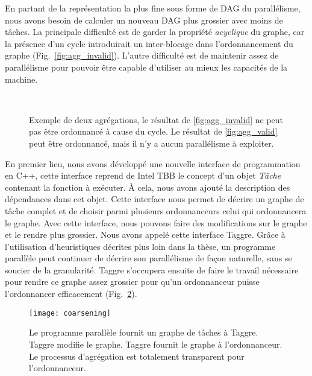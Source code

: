 En partant de la représentation la plus fine sous forme de DAG du parallélisme, nous avons besoin de calculer un nouveau DAG plus grossier avec moins de tâches.
%
La principale difficulté est de garder la propriété {\em acyclique} du graphe, car la présence d'un cycle introduirait un inter-blocage dans l'ordonnancement du graphe (Fig.~\ref{fig:agg_invalid}).
%
L'autre difficulté est de maintenir assez de parallélisme pour pouvoir être capable d'utiliser au mieux les capacités de la machine.
\begin{figure}[!h]
     \begin{center}
        ~
    \end{center}
    \caption{Exemple de deux agrégations, le résultat de \ref{fig:agg_invalid} ne peut pas être ordonnancé à cause du cycle. Le résultat de \ref{fig:agg_valid} peut être ordonnancé, mais il n'y a aucun parallélisme à exploiter.}
    \label{fig:agg_basic}
\end{figure}
En premier lieu, nous avons développé une nouvelle interface de programmation en C++, cette interface reprend de Intel TBB le concept d'un objet {\em Tâche} contenant la fonction à exécuter.
%
\`A cela, nous avons ajouté la description des dépendances dans cet objet.
%
Cette interface nous permet de décrire un graphe de tâche complet et de choisir parmi plusieurs ordonnanceurs celui qui ordonnancera le graphe.
%
Avec cette interface, nous pouvons faire des modifications sur le graphe et le rendre plus grossier.
%
Nous avons appelé cette interface Taggre.
%
Grâce à l'utilisation d'heuristiques décrites plus loin dans la thèse, un programme parallèle peut continuer de décrire son parallélisme de façon naturelle, sans se soucier de la granularité.
%
Taggre s'occupera ensuite de faire le travail nécessaire pour rendre ce graphe assez grossier pour qu'un ordonnanceur puisse l'ordonnancer efficacement (Fig.~\ref{fig:coarsening}).
\begin{figure}
  \centering
  \texttt{[image: coarsening]}
  \caption{Le programme parallèle fournit un graphe de tâches à Taggre. Taggre modifie le graphe. Taggre fournit le graphe à l'ordonnanceur. Le processus d'agrégation est totalement transparent pour l'ordonnanceur.}
  \label{fig:coarsening}
\end{figure}

